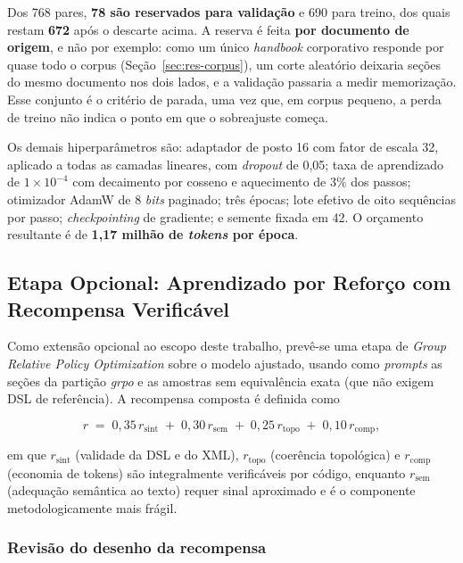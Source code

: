 Dos 768 pares, \textbf{78 são reservados para validação} e 690 para treino, dos quais restam \textbf{672} após o descarte acima. A reserva é feita \textbf{por documento de origem}, e não por exemplo: como um único \textit{handbook} corporativo responde por quase todo o corpus (Seção~\ref{sec:res-corpus}), um corte aleatório deixaria seções do mesmo documento nos dois lados, e a validação passaria a medir memorização. Esse conjunto é o critério de parada, uma vez que, em corpus pequeno, a perda de treino não indica o ponto em que o sobreajuste começa.

Os demais hiperparâmetros são: adaptador de posto 16 com fator de escala 32, aplicado a todas as camadas lineares, com \textit{dropout} de 0,05; taxa de aprendizado de $1 \times 10^{-4}$ com decaimento por cosseno e aquecimento de 3\% dos passos; otimizador AdamW de 8 \textit{bits} paginado; três épocas; lote efetivo de oito sequências por passo; \textit{checkpointing} de gradiente; e semente fixada em 42. O orçamento resultante é de \textbf{1,17 milhão de \textit{tokens} por época}.

\subsection{Etapa Opcional: Aprendizado por Reforço com Recompensa Verificável}
\label{subsec:grpo-metodo}

Como extensão opcional ao escopo deste trabalho, prevê-se uma etapa de \textit{Group Relative Policy Optimization} \cite{shao2024deepseekmath} sobre o modelo ajustado, usando como \textit{prompts} as seções da partição \textit{grpo} e as amostras sem equivalência exata (que não exigem DSL de referência). A recompensa composta é definida como

\begin{equation}
	r \;=\; 0{,}35\, r_{\text{sint}} \;+\; 0{,}30\, r_{\text{sem}} \;+\; 0{,}25\, r_{\text{topo}} \;+\; 0{,}10\, r_{\text{comp}},
\end{equation}

\noindent em que $r_{\text{sint}}$ (validade da DSL e do XML), $r_{\text{topo}}$ (coerência topológica) e $r_{\text{comp}}$ (economia de tokens) são integralmente verificáveis por código, enquanto $r_{\text{sem}}$ (adequação semântica ao texto) requer sinal aproximado e é o componente metodologicamente mais frágil.

\subsubsection*{Revisão do desenho da recompensa}

